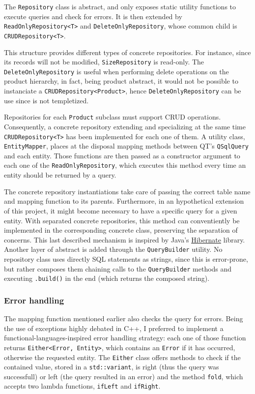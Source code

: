 \documentclass[10pt]{article}
\begin{document}
The \texttt{Repository} class is abstract, and only exposes static utility
functions to execute queries and check for errors. It is then extended by
\texttt{ReadOnlyRepository<T>} and \texttt{DeleteOnlyRepository}, whose common
child is \texttt{CRUDRepository<T>}.

This structure provides different types of concrete repositories. For instance,
since its records will not be modified, \texttt{SizeRepository} is read-only.
The \texttt{DeleteOnlyRepository} is useful when performing delete operations
on the product hierarchy, in fact, being product abstract, it would not be
possible to instanciate a \texttt{CRUDRepository<Product>}, hence
\texttt{DeleteOnlyRepository} can be use since is not templetized.

Repositories for each \texttt{Product} subclass must support CRUD operations.
Consequently, a concrete repository extending and specializing at the same time
\texttt{CRUDRepository<T>} has been implemented for each one of them. A utility
class, \texttt{EntityMapper}, places at the disposal mapping methods between
QT's \texttt{QSqlQuery} and each entity. Those functions are then passed as a
constructor argument to each one of the \texttt{ReadOnlyRepository}, which
executes this method every time an entity should be returned by a query.

The concrete repository instantiations take care of passing the correct table
name and mapping function to its parents. Furthermore, in an hypothetical
extension of this project, it might become necessary to have a specific query
for a given entity. With separated concrete repositories, this method can
conventiently be implemented in the corresponding concrete class, preserving
the separation of concerns. This last described mechanism is inspired by Java's
\href{https://hibernate.org/}{Hibernate} library.\\\linebreak Another layer of
abstract is added through the \texttt{QueryBuilder} utility. No repository
class uses directly SQL statements as strings, since this is error-prone, but
rather composes them chaining calls to the \texttt{QueryBuilder} methods and
executing \texttt{.build()} in the end (which returns the composed string).

\subsubsection{Error handling}
The mapping function mentioned earlier also checks the query for errors. Being
the use of exceptions highly debated in C++, I preferred to implement a
functional-languages-inspired error handling strategy: each one of those
function returns \texttt{Either<Error, Entity>}, which contains an
\texttt{Error} if it has occurred, otherwise the requested entity. The
\texttt{Either} class offers methods to check if the contained value, stored in
a \texttt{std::variant}, is right (thus the query was successfull) or left (the
query resulted in an error) and the method \texttt{fold}, which accepts two
lambda functions, \texttt{ifLeft} and \texttt{ifRight}.
\end{document}
